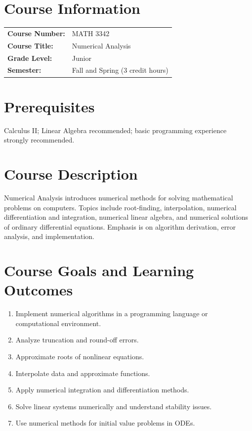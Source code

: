 \documentclass[12pt,oneside]{book}
\begin{document}
\section{Course Information}

\begin{tabular}{ll}
\textbf{Course Number:} & MATH 3342 \\
\textbf{Course Title:} & Numerical Analysis \\
\textbf{Grade Level:} & Junior \\
\textbf{Semester:} & Fall and Spring (3 credit hours) \\
\end{tabular}

\section{Prerequisites}

Calculus II; Linear Algebra recommended; basic programming experience strongly recommended.

\section{Course Description}

Numerical Analysis introduces numerical methods for solving mathematical problems on computers. Topics include root-finding, interpolation, numerical differentiation and integration, numerical linear algebra, and numerical solutions of ordinary differential equations. Emphasis is on algorithm derivation, error analysis, and implementation.

\section{Course Goals and Learning Outcomes}

\begin{enumerate}
    \item Implement numerical algorithms in a programming language or computational environment.
    \item Analyze truncation and round-off errors.
    \item Approximate roots of nonlinear equations.
    \item Interpolate data and approximate functions.
    \item Apply numerical integration and differentiation methods.
    \item Solve linear systems numerically and understand stability issues.
    \item Use numerical methods for initial value problems in ODEs.
\end{enumerate}
\end{document}
